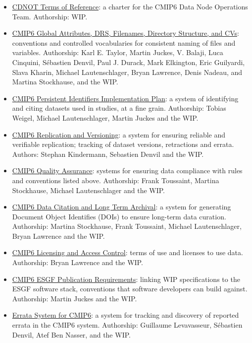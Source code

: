 \documentclass[gmd,manuscript]{copernicus}
\begin{document}
\begin{itemize}
\item \href{https://goo.gl/Z9yHnE}{CDNOT Terms of Reference}: a
  charter for the CMIP6 Data Node Operations Team. Authorship: WIP.
\item \href{https://goo.gl/cMiPE7}{CMIP6 Global Attributes, DRS,
    Filenames, Directory Structure, and CVs}: conventions and
  controlled vocabularies for consistent naming of files and
  variables. Authorship: Karl E. Taylor, Martin Juckes, V. Balaji,
  Luca Cinquini, Sébastien Denvil, Paul J. Durack, Mark Elkington,
  Eric Guilyardi, Slava Kharin, Michael Lautenschlager, Bryan
  Lawrence, Denis Nadeau, and Martina Stockhause, and the WIP.
\item \href{https://goo.gl/dQAEDy}{CMIP6 Persistent Identifiers
    Implementation Plan}: a system of identifying and citing datasets
  used in studies, at a fine grain. Authorship: Tobias Weigel, Michael
  Lautenschlager, Martin Juckes and the WIP.
\item \href{https://goo.gl/jqWjQ5}{CMIP6 Replication and Versioning}:
  a system for ensuring reliable and verifiable replication; tracking
  of dataset versions, retractions and errata. Authors: Stephan
  Kindermann, Sebastien Denvil and the WIP.
\item \href{https://goo.gl/vKmGM4}{CMIP6 Quality Assurance}: systems
  for ensuring data compliance with rules and conventions listed
  above. Authorship: Frank Toussaint, Martina Stockhause, Michael
  Lautenschlager and the WIP.
\item \href{https://goo.gl/CZyWq1}{CMIP6 Data Citation and Long Term
    Archival}: a system for generating Document Object Identifies
  (DOIs) to ensure long-term data curation. Authorship: Martina
  Stockhause, Frank Toussaint, Michael Lautenschlager, Bryan Lawrence
  and the WIP.
\item \href{https://goo.gl/h4HSP1}{CMIP6 Licensing and Access
    Control}: terms of use and licenses to use data. Authorship: Bryan
  Lawrence and the WIP.
\item \href{https://goo.gl/Ro97Rv}{CMIP6 ESGF Publication
    Requirements}: linking WIP specifications to the ESGF software
  stack, conventions that software developers can build against.
  Authorship: Martin Juckes and the WIP.
\item \href{https://goo.gl/qjs8WK}{Errata System for CMIP6}: a system
  for tracking and discovery of reported errata in the CMIP6 system.
  Authorship: Guillaume Levavasseur, Sébastien Denvil, Atef Ben
  Nasser, and the WIP.
\end{itemize}
\end{document}
